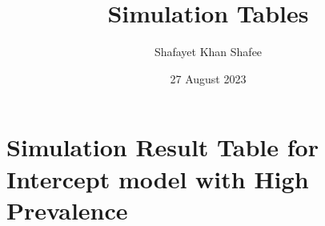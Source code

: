 \documentclass[
  letterpaper,
  DIV=11,
  numbers=noendperiod,
  titlepage]{scrartcl}
\title{Simulation Tables}
\author{Shafayet Khan Shafee}
\date{27 August 2023}
\renewcommand*\contentsname{Table of contents}
\newcommand\contentsname{Table of contents}
\begin{document}
\maketitle
\ifdefined\Shaded\renewenvironment{Shaded}{\begin{tcolorbox}[interior hidden, enhanced, frame hidden, borderline west={3pt}{0pt}{shadecolor}, boxrule=0pt, breakable, sharp corners]}{\end{tcolorbox}}\fi

\renewcommand*\contentsname{Table of contents}
{
\hypersetup{linkcolor=blue}
\setcounter{tocdepth}{3}
\tableofcontents
}
\newpage

\recalctypearea
{}

\hypertarget{simulation-result-table-for-intercept-model-with-high-prevalence}{%
\section{Simulation Result Table for Intercept model with High
Prevalence}\label{simulation-result-table-for-intercept-model-with-high-prevalence}}
\end{document}
